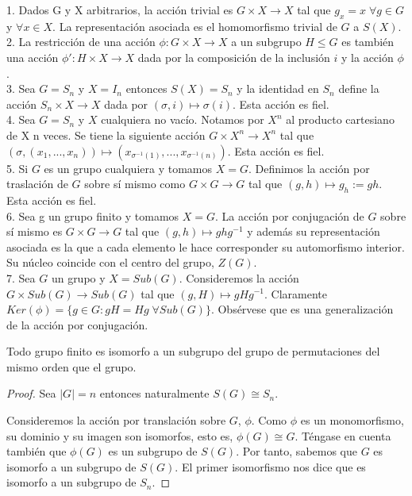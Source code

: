 \begin{ejemplo}
1. Dados G y X arbitrarios, la acción trivial es $G \times X \rightarrow X$ tal que $g_x = x \; \forall g \in G$ y $\forall x \in X$. La representación asociada es el homomorfismo trivial de $G$ a $S(X)$.\\
2. La restricción de una acción $\phi:G \times X \rightarrow X$ a un subgrupo $H \le G$ es también una acción $\phi':H \times X \rightarrow X$ dada por la composición de la inclusión $i$ y la acción $\phi$.\\
3. Sea $G = S_n$ y $X = I_n$ entonces $S(X) = S_n$ y la identidad en $S_n$ define la acción $S_n \times X \rightarrow X$ dada por $(\sigma,i) \mapsto \sigma(i)$. Esta acción es fiel.\\
4. Sea $G=S_n$ y $X$ cualquiera no vacío. Notamos por $X^n$ al producto cartesiano de X n veces. Se tiene la siguiente acción $G \times X^n \rightarrow X^n$ tal que $(\sigma,(x_1,...,x_n)) \mapsto (x_{\sigma^{-1}(1)},...,x_{\sigma^{-1}(n)})$. Esta acción es fiel.\\
5. Si $G$ es un grupo cualquiera y tomamos $X=G$. Definimos la acción por traslación de $G$ sobre sí mismo como $G \times G \rightarrow G$ tal que $(g,h) \mapsto g_h:=gh$. Esta acción es fiel.\\
6. Sea g un grupo finito y tomamos $X=G$. La acción por conjugación de $G$ sobre sí mismo es $G \times G \rightarrow G$ tal que $(g,h) \mapsto ghg^{-1}$ y además su representación asociada es la que a cada elemento le hace corresponder su automorfismo interior. Su núcleo coincide con el centro del grupo, $Z(G)$.\\
7. Sea $G$ un grupo y $X = Sub(G)$. Consideremos la acción $G \times Sub(G) \rightarrow Sub(G)$ tal que $(g,H) \mapsto gHg^{-1}$. Claramente $Ker(\phi) = \{g \in G:gH = Hg \; \forall Sub(G)\}$. Obsérvese que es una generalización de la acción por conjugación.
\end{ejemplo}

\begin{nth}
Todo grupo finito es isomorfo a un subgrupo del grupo de permutaciones del mismo orden que el grupo.
\end{nth}
\begin{proof}
Sea $|G|=n$ entonces naturalmente $S(G) \cong S_n$. 

Consideremos la acción por translación sobre $G$, $\phi$. Como $\phi$ es un monomorfismo, su dominio y su imagen son isomorfos, esto es, $\phi(G) \cong G$. Téngase en cuenta también que $\phi(G)$ es un subgrupo de $S(G)$. Por tanto, sabemos que $G$ es isomorfo a un subgrupo de $S(G)$. El primer isomorfismo nos dice que es isomorfo a un subgrupo de $S_n$.
\end{proof}

